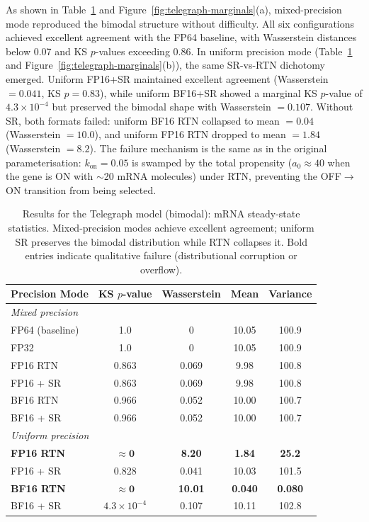 \documentclass{article}
\begin{document}
As shown in Table~\ref{tab:telegraph-bimodal} and Figure~\ref{fig:telegraph-marginals}(a), mixed-precision mode reproduced the bimodal structure without difficulty. All six configurations achieved excellent agreement with the FP64 baseline, with Wasserstein distances below 0.07 and KS $p$-values exceeding 0.86. In uniform precision mode (Table~\ref{tab:telegraph-bimodal} and Figure~\ref{fig:telegraph-marginals}(b)), the same SR-vs-RTN dichotomy emerged. Uniform FP16+SR maintained excellent agreement (Wasserstein $= 0.041$, KS $p = 0.83$), while uniform BF16+SR showed a marginal KS $p$-value of $4.3 \times 10^{-4}$ but preserved the bimodal shape with Wasserstein $= 0.107$. Without SR, both formats failed: uniform BF16 RTN collapsed to mean $= 0.04$ (Wasserstein $= 10.0$), and uniform FP16 RTN dropped to mean $= 1.84$ (Wasserstein $= 8.2$). The failure mechanism is the same as in the original parameterisation: $k_{\mathrm{on}} = 0.05$ is swamped by the total propensity ($a_0 \approx 40$ when the gene is ON with $\sim$20 mRNA molecules) under RTN, preventing the OFF$\to$ON transition from being selected.

\begin{table}[ht]
    \centering
    \begin{tabular}{@{}lcccc@{}}
        \toprule
        Precision Mode & KS $p$-value & Wasserstein & Mean & Variance \\
        \midrule
        \multicolumn{5}{l}{\textit{Mixed precision}} \\
        \midrule
        FP64 (baseline) & 1.0 & 0 & 10.05 & 100.9 \\
        FP32 & 1.0 & 0 & 10.05 & 100.9 \\
        FP16 RTN & 0.863 & 0.069 & 9.98 & 100.8 \\
        FP16 + SR & 0.863 & 0.069 & 9.98 & 100.8 \\
        BF16 RTN & 0.966 & 0.052 & 10.00 & 100.7 \\
        BF16 + SR & 0.966 & 0.052 & 10.00 & 100.7 \\
        \midrule
        \multicolumn{5}{l}{\textit{Uniform precision}} \\
        \midrule
        \textbf{FP16 RTN} & $\mathbf{\approx 0}$ & \textbf{8.20} & \textbf{1.84} & \textbf{25.2} \\
        FP16 + SR & 0.828 & 0.041 & 10.03 & 101.5 \\
        \textbf{BF16 RTN} & $\mathbf{\approx 0}$ & \textbf{10.01} & \textbf{0.040} & \textbf{0.080} \\
        BF16 + SR & $4.3 \times 10^{-4}$ & 0.107 & 10.11 & 102.8 \\
        \bottomrule
    \end{tabular}
    \caption{Results for the Telegraph model (bimodal): mRNA steady-state statistics. Mixed-precision modes achieve excellent agreement; uniform SR preserves the bimodal distribution while RTN collapses it. Bold entries indicate qualitative failure (distributional corruption or overflow).}
    \label{tab:telegraph-bimodal}
\end{table}
\end{document}
